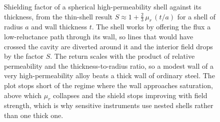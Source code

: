 \begin{figure}[htbp]
\centering
{}
\caption[Magnetic shielding factor of a high-permeability shell]{Shielding
factor of a spherical high-permeability shell against its thickness, from
the thin-shell result $S \approx 1 + \tfrac23\,\mu_r\,(t/a)$ for a shell of
radius $a$ and wall thickness $t$. The shell works by offering the flux a
low-reluctance path through its wall, so lines that would have crossed the
cavity are diverted around it and the interior field drops by the factor
$S$. The return scales with the product of relative permeability and the
thickness-to-radius ratio, so a modest wall of a very high-permeability
alloy beats a thick wall of ordinary steel. The plot stops short of the
regime where the wall approaches saturation, above which $\mu_r$ collapses
and the shield stops improving with field strength, which is why sensitive
instruments use nested shells rather than one thick one.}
\label{fig:vol04ch08:magnetic-shielding}
\end{figure}
